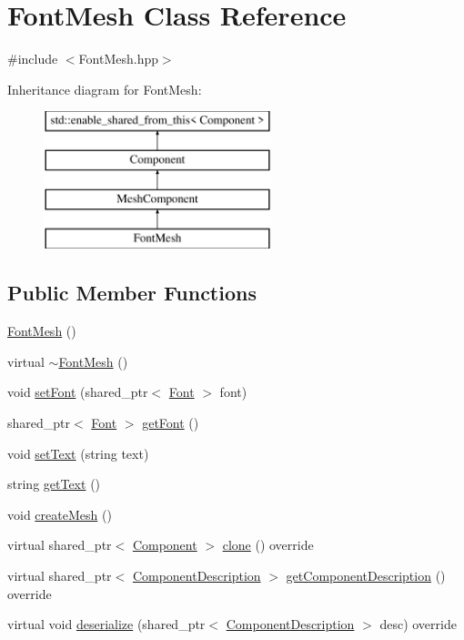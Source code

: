 \hypertarget{class_font_mesh}{}\section{Font\+Mesh Class Reference}
\label{class_font_mesh}


{\ttfamily \#include $<$Font\+Mesh.\+hpp$>$}

Inheritance diagram for Font\+Mesh\+:\begin{figure}[H]
\begin{center}
\leavevmode
\includegraphics[height=4.000000cm]{class_font_mesh}
\end{center}
\end{figure}
\subsection*{Public Member Functions}
\begin{DoxyCompactItemize}
\item 
\hyperlink{class_font_mesh_aedfa6f6af9efdbe4c1fe400c128d74f8}{Font\+Mesh} ()
\item 
virtual \hyperlink{class_font_mesh_aa72cdbc114c4bd907cd3c80a0516eaa1}{$\sim$\+Font\+Mesh} ()
\item 
void \hyperlink{class_font_mesh_a9c8c08a909a3f1f8fe49427b714f49ea}{set\+Font} (shared\+\_\+ptr$<$ \hyperlink{class_font}{Font} $>$ font)
\item 
shared\+\_\+ptr$<$ \hyperlink{class_font}{Font} $>$ \hyperlink{class_font_mesh_a8ecf4127c1b8903e2d88e4010e5456c7}{get\+Font} ()
\item 
void \hyperlink{class_font_mesh_ab7b118065bcbaba9dad67fc472eb747d}{set\+Text} (string text)
\item 
string \hyperlink{class_font_mesh_a8be85c214ce53ce1c706a555c9c0c047}{get\+Text} ()
\item 
void \hyperlink{class_font_mesh_a604facf912301eb3443e5532a6f389d3}{create\+Mesh} ()
\item 
virtual shared\+\_\+ptr$<$ \hyperlink{class_component}{Component} $>$ \hyperlink{class_font_mesh_a4dd3900fcbb33aca326d1cd1871e7b92}{clone} () override
\item 
virtual shared\+\_\+ptr$<$ \hyperlink{class_component_description}{Component\+Description} $>$ \hyperlink{group__serialization__functions_gab58270595083da13e7c384f00318291b}{get\+Component\+Description} () override
\item 
virtual void \hyperlink{group__serialization__functions_ga76f4b78e5fd2adece4557f2a676f2c1b}{deserialize} (shared\+\_\+ptr$<$ \hyperlink{class_component_description}{Component\+Description} $>$ desc) override
\end{DoxyCompactItemize}
